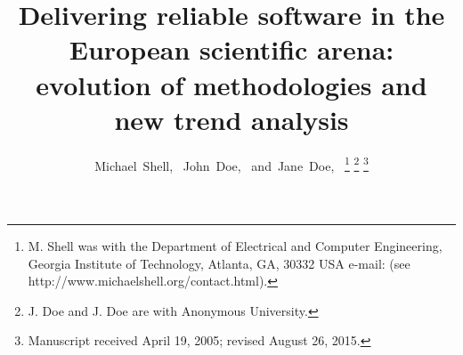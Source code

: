 \documentclass[journal]{IEEEtran}
\begin{document}
%
\title{Delivering reliable software in the European scientific arena: evolution of methodologies and new trend analysis}

%
%
%

\author{Michael~Shell,~
        John~Doe,~
        and~Jane~Doe,~%
\thanks{M. Shell was with the Department
of Electrical and Computer Engineering, Georgia Institute of Technology, Atlanta,
GA, 30332 USA e-mail: (see http://www.michaelshell.org/contact.html).}%
\thanks{J. Doe and J. Doe are with Anonymous University.}%
\thanks{Manuscript received April 19, 2005; revised August 26, 2015.}}

%
%
\end{document}
